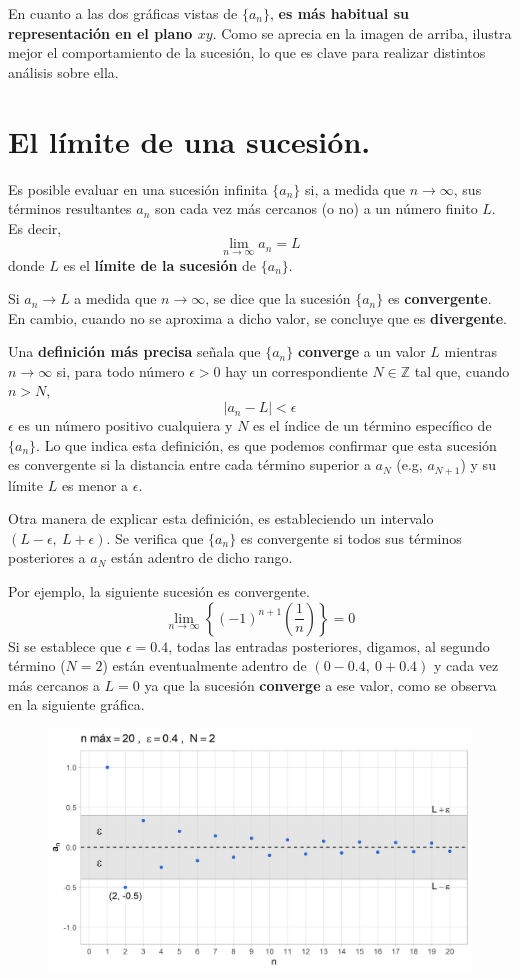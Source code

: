 \documentclass[12pt]{article}
\begin{document}
En cuanto a las dos gráficas vistas de $\{a_{n}\}$, \textbf{es más habitual su representación en el plano $xy$}. Como se aprecia en la imagen de arriba, ilustra mejor el comportamiento de la sucesión, lo que es clave para realizar distintos análisis sobre ella.


\section{El límite de una sucesión.}

Es posible evaluar en una sucesión infinita $\{a_{n}\}$ si, a medida que $n \to \infty$, sus términos resultantes $a_{n}$ son cada vez más cercanos (o no) a un número finito $L$. Es decir,
\[
  \lim_{n \to \infty} a_{n} = L
\]
donde $L$ es el \textbf{límite de la sucesión} de $\{a_{n}\}$.

Si $a_{n} \to L$ a medida que $n \to \infty$, se dice que la sucesión $\{a_{n}\}$ es \textbf{convergente}. En cambio, cuando no se aproxima a dicho valor, se concluye que es \textbf{divergente}.

Una \textbf{definición más precisa} señala que $\{a_{n}\}$ \textbf{converge} a un valor $L$ mientras $n \to \infty$ si, para todo número $\epsilon > 0$ hay un correspondiente $N \in \mathbb{Z}$ tal que, cuando $n > N$,
\[
  |a_{n} - L| < \epsilon
\]
$\epsilon$ es un número positivo cualquiera y $N$ es el índice de un término específico de $\{a_{n}\}$. Lo que indica esta definición, es que podemos confirmar que esta sucesión es convergente si la distancia entre cada término superior a $a_{N}$  (e.g, $a_{N + 1}$) y su límite $L$ es menor a $\epsilon$.

Otra manera de explicar esta definición, es estableciendo un intervalo $(L - \epsilon, \ L + \epsilon)$. Se verifica que $\{a_{n}\}$ es convergente si todos sus términos posteriores a $a_{N}$ están adentro de dicho rango.

Por ejemplo, la siguiente sucesión es convergente.
\[
  \lim_{n \to \infty} \left\{(-1)^{n + 1} \left(\frac{1}{n}\right)\right\} = 0
\]
Si se establece que $\epsilon = 0.4$, todas las entradas posteriores, digamos, al segundo término ($N = 2$) están eventualmente adentro de $(0 - 0.4, \ 0 + 0.4)$ y cada vez más cercanos a $L = 0$ ya que la sucesión \textbf{converge} a ese valor, como se observa en la siguiente gráfica.

\begin{figure}[hbt!]
\centering
\includegraphics[scale=0.7]{limit-seq-01.jpg}
\end{figure}
\end{document}
